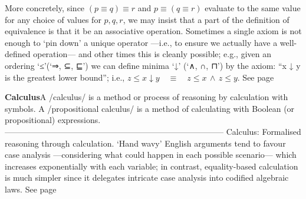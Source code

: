\documentclass[11pt]{article}
\begin{document}
 More concretely, since $(p ≡ q) ≡ r$ and $p ≡ (q ≡ r)$ evaluate to the same value for any choice of values for $p, q, r$, we may insist that a part of the definition of equivalence is that it be an associative operation.  Sometimes a single axiom is not enough to ‘pin down’ a unique operator ---i.e., to ensure we actually have a well-defined operation--- and other times this is cleanly possible; e.g., given an ordering ‘≤’(‘⇒, ⊆, ⊑’) we can define minima ‘↓’ (‘∧, ∩, ⊓’) by the axiom: “x ↓ y is the greatest lower bound”; i.e., $z ≤ x ↓ y \quad≡\quad z ≤ x \,∧\, z ≤ y$. See page \pageref{org-special-block-extras-glossary-declaration-site-Semantics}

\vspace{1em}\textbf{Calculus}\quad\label{org-special-block-extras-glossary-Propositional_Calculus}A /calculus/ is a method or process of reasoning by calculation with symbols. A /propositional calculus/ is a method of calculating with Boolean (or propositional) expressions.  --------------------------------------------------------------------------------  Calculus: Formalised reasoning through calculation.  ‘Hand wavy’ English arguments tend to favour case analysis —considering what could happen in each possible scenario— which increases exponentially with each variable; in contrast, equality-based calculation is much simpler since it delegates intricate case analysis into codified algebraic laws. See page \pageref{org-special-block-extras-glossary-declaration-site-Propositional_Calculus}
\end{document}
